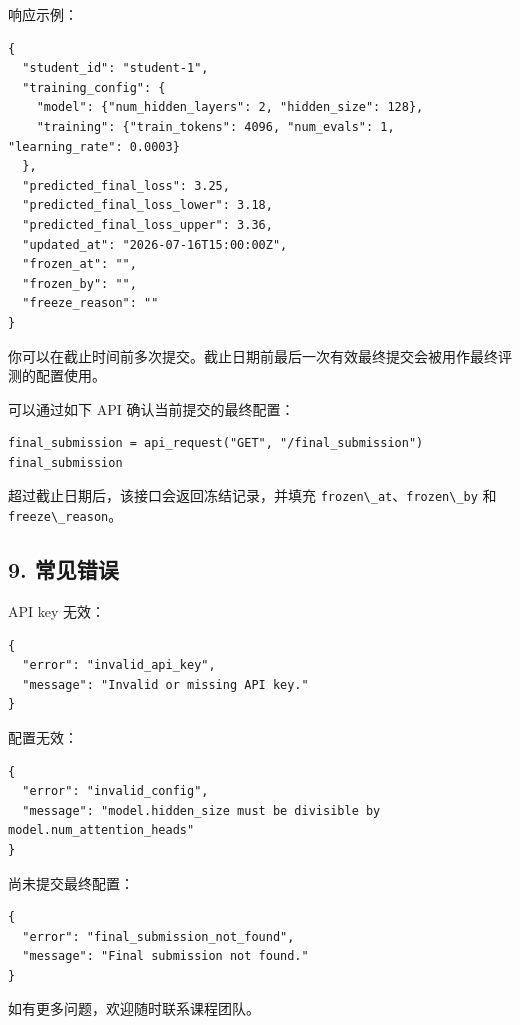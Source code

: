 \documentclass[
]{ctexart}
\newcommand{\passthrough}[1]{#1}
\begin{document}
响应示例：

\begin{verbatim}
{
  "student_id": "student-1",
  "training_config": {
    "model": {"num_hidden_layers": 2, "hidden_size": 128},
    "training": {"train_tokens": 4096, "num_evals": 1, "learning_rate": 0.0003}
  },
  "predicted_final_loss": 3.25,
  "predicted_final_loss_lower": 3.18,
  "predicted_final_loss_upper": 3.36,
  "updated_at": "2026-07-16T15:00:00Z",
  "frozen_at": "",
  "frozen_by": "",
  "freeze_reason": ""
}
\end{verbatim}

你可以在截止时间前多次提交。截止日期前最后一次有效最终提交会被用作最终评测的配置使用。

可以通过如下 API 确认当前提交的最终配置：

\begin{verbatim}
final_submission = api_request("GET", "/final_submission")
final_submission
\end{verbatim}

超过截止日期后，该接口会返回冻结记录，并填充
\passthrough{\lstinline!frozen\_at!}、\passthrough{\lstinline!frozen\_by!}
和 \passthrough{\lstinline!freeze\_reason!}。

\hypertarget{ux5e38ux89c1ux9519ux8bef}{%
\subsection{9. 常见错误}\label{ux5e38ux89c1ux9519ux8bef}}

API key 无效：

\begin{verbatim}
{
  "error": "invalid_api_key",
  "message": "Invalid or missing API key."
}
\end{verbatim}

配置无效：

\begin{verbatim}
{
  "error": "invalid_config",
  "message": "model.hidden_size must be divisible by model.num_attention_heads"
}
\end{verbatim}

尚未提交最终配置：

\begin{verbatim}
{
  "error": "final_submission_not_found",
  "message": "Final submission not found."
}
\end{verbatim}

如有更多问题，欢迎随时联系课程团队。
\end{document}
